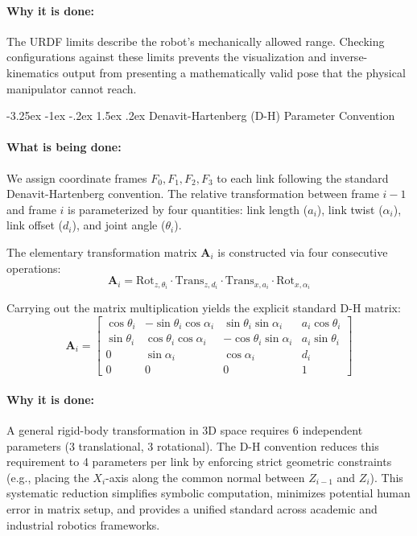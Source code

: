 \documentclass[11pt, a4paper]{article}
\makeatletter
\renewcommand{\subsection}{\@startsection{subsection}{2}{\z@}%
    {-3.25ex \@plus -1ex \@minus -.2ex}%
    {1.5ex \@plus .2ex}%
    {\normalfont\large\bfseries\color{brandaccent}}}
\makeatother
\begin{document}
\paragraph{Why it is done:}
The URDF limits describe the robot's mechanically allowed range. Checking configurations against these limits prevents the visualization and inverse-kinematics output from presenting a mathematically valid pose that the physical manipulator cannot reach.

\subsection{Denavit-Hartenberg (D-H) Parameter Convention}
\paragraph{What is being done:}
We assign coordinate frames $F_0, F_1, F_2, F_3$ to each link following the standard Denavit-Hartenberg convention. The relative transformation between frame $i-1$ and frame $i$ is parameterized by four quantities: link length ($a_i$), link twist ($\alpha_i$), link offset ($d_i$), and joint angle ($\theta_i$).

The elementary transformation matrix $\mathbf{A}_i$ is constructed via four consecutive operations:
\begin{equation}
    \mathbf{A}_i = \text{Rot}_{z, \theta_i} \cdot \text{Trans}_{z, d_i} \cdot \text{Trans}_{x, a_i} \cdot \text{Rot}_{x, \alpha_i}
\end{equation}

Carrying out the matrix multiplication yields the explicit standard D-H matrix:
\begin{equation}
    \mathbf{A}_i = \begin{bmatrix} 
    \cos\theta_i & -\sin\theta_i \cos\alpha_i & \sin\theta_i \sin\alpha_i & a_i \cos\theta_i \\ 
    \sin\theta_i & \cos\theta_i \cos\alpha_i & -\cos\theta_i \sin\alpha_i & a_i \sin\theta_i \\ 
    0 & \sin\alpha_i & \cos\alpha_i & d_i \\ 
    0 & 0 & 0 & 1 
    \end{bmatrix}
\end{equation}

\paragraph{Why it is done:}
A general rigid-body transformation in 3D space requires 6 independent parameters (3 translational, 3 rotational). The D-H convention reduces this requirement to 4 parameters per link by enforcing strict geometric constraints (e.g., placing the $X_i$-axis along the common normal between $Z_{i-1}$ and $Z_i$). This systematic reduction simplifies symbolic computation, minimizes potential human error in matrix setup, and provides a unified standard across academic and industrial robotics frameworks.
\end{document}
